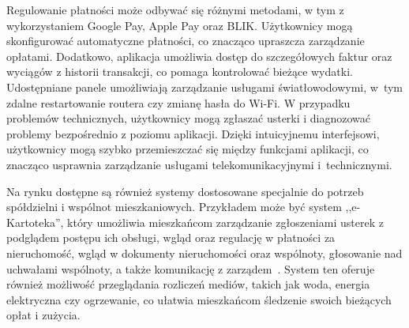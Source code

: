 Regulowanie płatności może odbywać się różnymi metodami, w tym z wykorzystaniem Google Pay, Apple Pay oraz BLIK. Użytkownicy mogą skonfigurować automatyczne płatności, co znacząco upraszcza zarządzanie opłatami. Dodatkowo, aplikacja umożliwia dostęp do szczegółowych faktur oraz wyciągów z historii transakcji, co pomaga kontrolować bieżące wydatki. Udostępniane panele umożliwiają zarządzanie usługami światłowodowymi, w~tym zdalne restartowanie routera czy zmianę hasła do Wi-Fi. W przypadku problemów technicznych, użytkownicy mogą zgłaszać usterki i diagnozować problemy bezpośrednio z poziomu aplikacji. Dzięki intuicyjnemu interfejsowi, użytkownicy mogą szybko przemieszczać się między funkcjami aplikacji, co znacząco usprawnia zarządzanie usługami telekomunikacyjnymi i~technicznymi.

Na rynku dostępne są również systemy dostosowane specjalnie do potrzeb spółdzielni i wspólnot mieszkaniowych. Przykładem może być system ,,e-Kartoteka'', który umożliwia mieszkańcom zarządzanie zgłoszeniami usterek z podglądem postępu ich obsługi, wgląd oraz regulację w płatności za nieruchomość, wgląd w dokumenty nieruchomości oraz wspólnoty, głosowanie nad uchwałami wspólnoty, a także komunikację z zarządem~\cite{e-kartoteka}. System ten oferuje również możliwość przeglądania rozliczeń mediów, takich jak woda, energia elektryczna czy ogrzewanie, co ułatwia mieszkańcom śledzenie swoich bieżących opłat i zużycia. 

